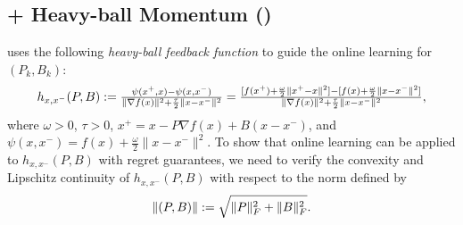 \subsection{{\hdm} + Heavy-ball Momentum ({\hdmhb})} \label{app:heavy-ball}

 uses the following \emph{heavy-ball feedback function} to guide the online learning for $(P_k, B_k)$:
\begin{equation*}
  h_{x, x^-} (P, B) := 
  \tfrac{\psi(x^{+}, x) - \psi(x, x^{-})}{\| \nabla f (x) \|^2 + \frac{\tau}{2} \| x - x^- \|^2}
  = \tfrac{[f (x^+) + \frac{\omega}{2} \| x^+ - x \|^2] - [f (x) + \frac{\omega}{2} \| x - x^- \|^2]}{\| \nabla f (x) \|^2 + \frac{\tau}{2} \| x - x^- \|^2}, 
\end{equation*}
where $\omega > 0$, $ \tau > 0$, $x^{+} = x - P \nabla f (x) + B (x - x^{-})$, and $\psi(x, x^-) = f (x) + \tfrac{\omega}{2} \| x - x^- \|^2$.
To show that online learning can be applied to $h_{x, x^-} (P, B)$ with regret guarantees, we need to verify the convexity and Lipschitz continuity of $h_{x, x^-} (P, B)$ with respect to the norm defined by
\begin{equation} \label{eqn:PB-norm}
  \|(P, B)\| := \sqrt{\|P\|_F^2 + \|B\|_F^2}.
\end{equation}


